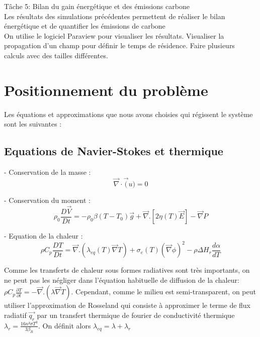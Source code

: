 \documentclass[12pt, a4paper, french, BCOR = 0pt, DIV = 10]{scrartcl}
\begin{document}
	Tâche 5: Bilan du gain énergétique et des émissions carbone\\
    Les résultats des simulations précédentes permettent de réaliser le bilan énergétique et de quantifier les émissions de carbone\\ [0.5cm]
	
	
	On  utilise le logiciel Paraview pour visualiser les résultats.
	Visualiser la propagation d'un champ pour définir le temps de résidence.
	Faire plusieurs calculs avec des tailles différentes.
	
	\section{Positionnement du problème}
	Les équations et approximations que nous avons choisies qui régissent le système sont les suivantes : \\
	\subsection{ Equations de Navier-Stokes et thermique }
    - Conservation de la masse :
    $$\vec{\nabla}\cdot \vec(u)=0$$

    - Conservation du moment :
    $$\rho_{0} \frac{D\vec{V}}{Dt} = -\rho_{0} \beta (T-T_{0}) \vec{g} + \vec {\nabla} . [ 2 \eta (T) \vec{E}] - \vec {\nabla} P$$

    - Equation de la chaleur :
    $$\rho C_{p} \frac{DT}{Dt} = \vec {\nabla} .  (\lambda_{eq}(T) \vec{\nabla} T ) + \sigma_{e}(T) (\vec \nabla\phi)^2 - \rho\Delta H_{r} \frac{d\alpha}{dT}$$
    
	Comme les transferts de chaleur sous formes radiatives sont très importants, on ne peut pas les négliger dans l'équation habituelle de diffusion de la chaleur: $ \rho C_{p} \frac{\partial T}{\partial t} = - \vec{\nabla} . (\lambda\vec{\nabla}T) $. Cependant, comme le milieu est semi-transparent, on peut utiliser l'approximation de Rosseland qui consiste à approximer le terme de flux radiatif $\vec{q_r}$ par un transfert thermique de fourier de conductivité thermique $\lambda_{r} = \frac{16n² \sigma T^{3}}{3\beta_{R}} $. On définit alors $\lambda_{eq} = \lambda + \lambda_r$
	\\ [0.5 cm]
	
\end{document}
